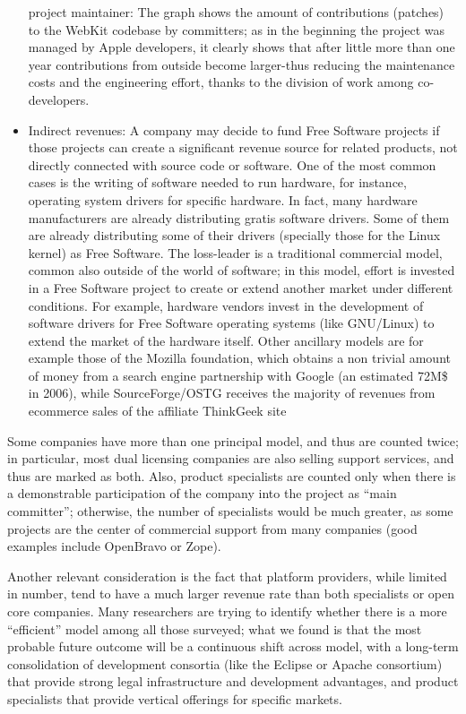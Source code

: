 \begin{itemize}
project maintainer:  The graph shows the amount of contributions
(patches) to the WebKit codebase by committers; as in the beginning the project
was managed by Apple developers, it clearly shows that after little more than
one year contributions from outside become larger-thus reducing the maintenance
costs and the engineering effort, thanks to the division of work among
co-developers.
 \item Indirect revenues: A company may decide to fund Free Software projects if
those projects can create a significant revenue source for related products, not
directly connected with source code or software. One of the most common cases is
the writing of software needed to run hardware, for instance, operating system
drivers for specific hardware. In fact, many hardware manufacturers are already
distributing gratis software drivers. Some of them are already distributing some
of their drivers (specially those for the Linux kernel) as Free Software. The
loss-leader is a traditional commercial model, common also outside of the world
of software; in this model, effort is invested in a Free Software project to
create or extend another market under different conditions. For example,
hardware vendors invest in the development of software drivers for Free Software
operating systems (like GNU/Linux) to extend the market of the hardware itself.
Other ancillary models are for example those of the Mozilla foundation, which
obtains a non trivial amount of money from a search engine partnership with
Google (an estimated 72M\$ in 2006), while SourceForge/OSTG receives the
majority of revenues from ecommerce sales of the affiliate ThinkGeek site
\end{itemize}

Some companies have more than one principal model, and thus are counted twice;
in particular, most dual licensing companies are also selling support services,
and thus are marked as both. Also, product specialists are counted only when
there is a demonstrable participation of the company into the project as ``main
committer''; otherwise, the number of specialists would be much greater, as some
projects are the center of commercial support from many companies (good
examples include OpenBravo or Zope).

Another relevant consideration is the fact that platform providers, while
limited in number, tend to have a much larger revenue rate than both specialists
or open core companies. Many researchers are trying to identify whether there is
a more ``efficient'' model among all those surveyed; what we found is that the
most probable future outcome will be a continuous shift across model, with a
long-term consolidation of development consortia (like the Eclipse or Apache
consortium) that provide strong legal infrastructure and development advantages,
and product specialists that provide vertical offerings for specific markets. 

